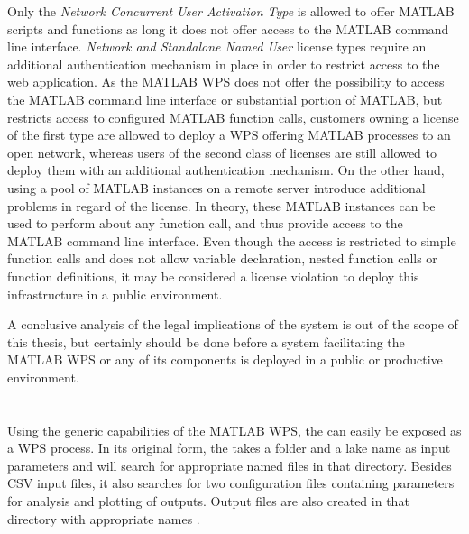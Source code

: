 		Only the \emph{Network Concurrent User Activation Type} is allowed to offer MATLAB scripts and functions as long it does not offer access to the MATLAB command line interface. \emph{Network and Standalone Named User} license types require an additional authentication mechanism in place in order to restrict access to the web application. As the MATLAB WPS does not offer the possibility to access the MATLAB command line interface or substantial portion of MATLAB, but restricts access to configured MATLAB function calls, customers owning a license of the first type are allowed to deploy a \ac{WPS} offering MATLAB processes to an open network, whereas users of the second class of licenses are still allowed to deploy them with an additional authentication mechanism. On the other hand, using a pool of MATLAB instances on a remote server introduce additional problems in regard of the license. In theory, these MATLAB instances can be used to perform about any function call, and thus provide access to the MATLAB command line interface. Even though the access is restricted to simple function calls and does not allow variable declaration, nested function calls or function definitions, it may be considered a license violation to deploy this infrastructure in a public environment.

		A conclusive analysis of the legal implications of the system is out of the scope of this thesis, but certainly should be done before a system facilitating the MATLAB WPS or any of its components is deployed in a public or productive environment.
	\section{\la}
		Using the generic capabilities of the MATLAB WPS, the \la can easily be exposed as a \ac{WPS} process. In its original form, the \la takes a folder and a lake name as input parameters and will search for appropriate named files in that directory. Besides CSV input files, it also searches for two configuration files containing parameters for analysis and plotting of outputs. Output files are also created in that directory with appropriate names \citep{lamanual}.


